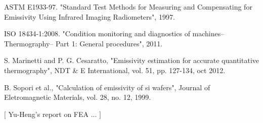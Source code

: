 \begin{enumerate}[label={[\arabic*]}]
		\item ASTM E1933-97. "Standard Test Methods for Measuring and Compensating for Emissivity Using Infrared Imaging Radiometers", 1997.\label{ref10}
		
		\item ISO 18434-1:2008. "Condition monitoring and diagnostics of machines–Thermography– Part 1: General procedures", 2011.\label{ref11}
		
		\item S. Marinetti and P. G. Cesaratto, "Emissivity estimation for accurate quantitative thermography", NDT \& E International, vol. 51, pp. 127-134, oct 2012.\label{ref12}
		
		\item B. Sopori et al., "Calculation of emissivity of si wafers", Journal of Eletromagnetic Materials, vol. 28, no. 12, 1999.\label{ref13}
		
		\item $[$ Yu-Heng's report on FEA ... $]$\label{ref14}
	\end{enumerate}